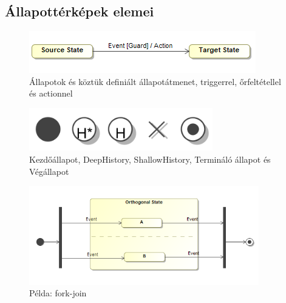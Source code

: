 \appendix
\chapter*{\fuggelek}
\setcounter{chapter}{\appendixnumber}

\section{Állapottérképek elemei}

\begin{figure}[!ht]
	\centering
	\includegraphics[keepaspectratio]{figures/statechart_elements/states.png}
	\caption{Állapotok és köztük definiált állapotátmenet, triggerrel, őrfeltétellel és actionnel}
\end{figure}

\begin{figure}[!ht]
	\centering
	\includegraphics[keepaspectratio, width=80mm]{figures/pseudo-and-final.png}
	\caption{Kezdőállapot, DeepHistory, ShallowHistory, Termináló állapot és Végállapot}
\end{figure}

\begin{figure}[!ht]
	\centering
	\includegraphics[keepaspectratio, width=100mm]{figures/statechart_elements/forkjoin.png}
	\caption{Példa: fork-join}
\end{figure}

